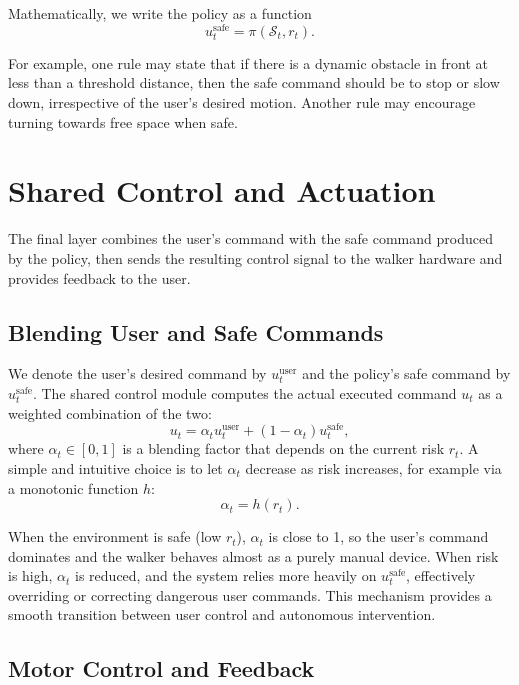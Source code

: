 \documentclass{article}
\begin{document}
Mathematically, we write the policy as a function
\begin{equation}
    u_t^{\text{safe}} = \pi(\mathcal{S}_t, r_t).
\end{equation}

For example, one rule may state that if there is a dynamic obstacle in front at less than a threshold distance, then the safe command should be to stop or slow down, irrespective of the user's desired motion. Another rule may encourage turning towards free space when safe.

\section{Shared Control and Actuation}

The final layer combines the user's command with the safe command produced by the policy, then sends the resulting control signal to the walker hardware and provides feedback to the user.

\subsection{Blending User and Safe Commands}

We denote the user's desired command by $u_t^{\text{user}}$ and the policy's safe command by $u_t^{\text{safe}}$. The shared control module computes the actual executed command $u_t$ as a weighted combination of the two:
\begin{equation}
    u_t = \alpha_t u_t^{\text{user}} + (1 - \alpha_t) u_t^{\text{safe}},
\end{equation}
where $\alpha_t \in [0, 1]$ is a blending factor that depends on the current risk $r_t$. A simple and intuitive choice is to let $\alpha_t$ decrease as risk increases, for example via a monotonic function $h$:
\begin{equation}
    \alpha_t = h(r_t).
\end{equation}

When the environment is safe (low $r_t$), $\alpha_t$ is close to 1, so the user's command dominates and the walker behaves almost as a purely manual device. When risk is high, $\alpha_t$ is reduced, and the system relies more heavily on $u_t^{\text{safe}}$, effectively overriding or correcting dangerous user commands. This mechanism provides a smooth transition between user control and autonomous intervention.

\subsection{Motor Control and Feedback}
\end{document}
